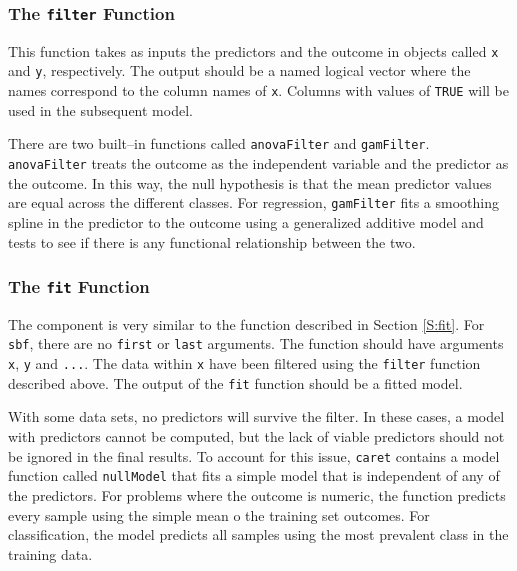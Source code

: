 \documentclass[12pt]{article}
\begin{document}
\subsubsection{The \texttt{filter} Function}\label{S:filter}

This function takes as inputs the predictors and the outcome in
objects called \texttt{x} and \texttt{y}, respectively. The output
should be a named logical vector where the names correspond to the
column names of \texttt{x}. Columns with values of \texttt{TRUE} will
be used in the subsequent model.

There are two built--in functions called \texttt{anovaFilter} and
\texttt{gamFilter}. \texttt{anovaFilter} treats the outcome as the
independent variable and the predictor as the outcome. In this way,
the null hypothesis is that the mean predictor values are equal across
the different classes. For regression, \texttt{gamFilter} fits a smoothing spline in
the predictor to the outcome  using a generalized additive model and tests to see if there is any
functional relationship between the two. 

\subsubsection{The \texttt{fit} Function}

The component is very similar to the function described in Section
\ref{S:fit}. For \texttt{sbf}, there are no \texttt{first} or
\texttt{last} arguments. The function should have arguments
\texttt{x}, \texttt{y} and \texttt{...}. The data within \texttt{x}
have been filtered using the \texttt{filter} function described
above. The output of the \texttt{fit} function should be a fitted model.


With some data sets, no predictors will survive the filter. In these cases, a model with predictors cannot be computed, but the lack of viable predictors should not be ignored in the final results. To account for this issue, \texttt{caret} contains a model function called \texttt{nullModel} that fits a simple model that is independent of any of the predictors. For problems where the outcome is numeric, the function predicts every sample using the simple mean o the training set outcomes. For classification, the model predicts all samples using the most prevalent class in the training data.
\end{document}
